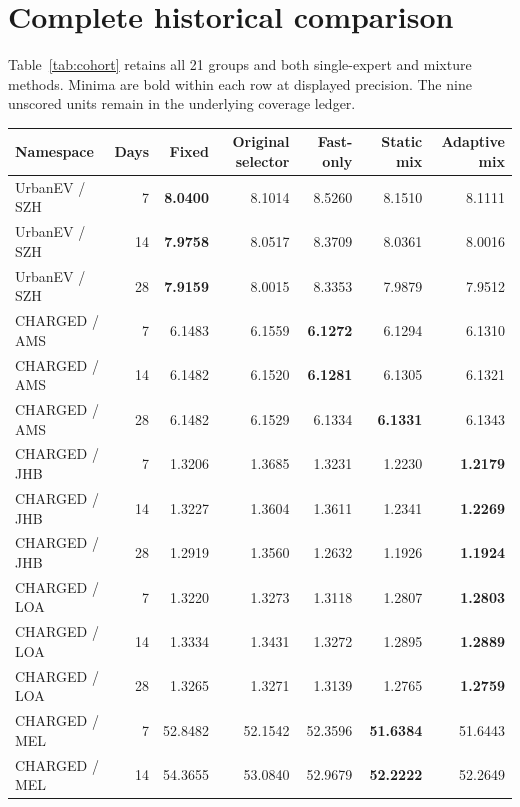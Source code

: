 \documentclass[pdflatex,iicol,sn-mathphys-num]{sn-jnl}
\begin{document}
\FloatBarrier
\clearpage
\onecolumn
\appendix
\section{Complete historical comparison}\label{app:cohort}
Table~\ref{tab:cohort} retains all 21 groups and both single-expert and mixture methods. Minima are bold within each row at displayed precision. The nine unscored units remain in the underlying coverage ledger.

\noindent\begin{minipage}{\textwidth}
\centering\small
{}\label{tab:cohort}
\begin{tabular*}{\textwidth}{@{\extracolsep{\fill}}lrrrrrr@{}}\toprule
Namespace & Days & Fixed & Original selector & Fast-only & Static mix & Adaptive mix\\\midrule
UrbanEV / SZH & 7 & \textbf{8.0400} & 8.1014 & 8.5260 & 8.1510 & 8.1111\\
UrbanEV / SZH & 14 & \textbf{7.9758} & 8.0517 & 8.3709 & 8.0361 & 8.0016\\
UrbanEV / SZH & 28 & \textbf{7.9159} & 8.0015 & 8.3353 & 7.9879 & 7.9512\\
\addlinespace[3pt]
CHARGED / AMS & 7 & 6.1483 & 6.1559 & \textbf{6.1272} & 6.1294 & 6.1310\\
CHARGED / AMS & 14 & 6.1482 & 6.1520 & \textbf{6.1281} & 6.1305 & 6.1321\\
CHARGED / AMS & 28 & 6.1482 & 6.1529 & 6.1334 & \textbf{6.1331} & 6.1343\\
\addlinespace[3pt]
CHARGED / JHB & 7 & 1.3206 & 1.3685 & 1.3231 & 1.2230 & \textbf{1.2179}\\
CHARGED / JHB & 14 & 1.3227 & 1.3604 & 1.3611 & 1.2341 & \textbf{1.2269}\\
CHARGED / JHB & 28 & 1.2919 & 1.3560 & 1.2632 & 1.1926 & \textbf{1.1924}\\
\addlinespace[3pt]
CHARGED / LOA & 7 & 1.3220 & 1.3273 & 1.3118 & 1.2807 & \textbf{1.2803}\\
CHARGED / LOA & 14 & 1.3334 & 1.3431 & 1.3272 & 1.2895 & \textbf{1.2889}\\
CHARGED / LOA & 28 & 1.3265 & 1.3271 & 1.3139 & 1.2765 & \textbf{1.2759}\\
\addlinespace[3pt]
CHARGED / MEL & 7 & 52.8482 & 52.1542 & 52.3596 & \textbf{51.6384} & 51.6443\\
CHARGED / MEL & 14 & 54.3655 & 53.0840 & 52.9679 & \textbf{52.2222} & 52.2649\\

\end{tabular*}
\end{minipage}
\end{document}
